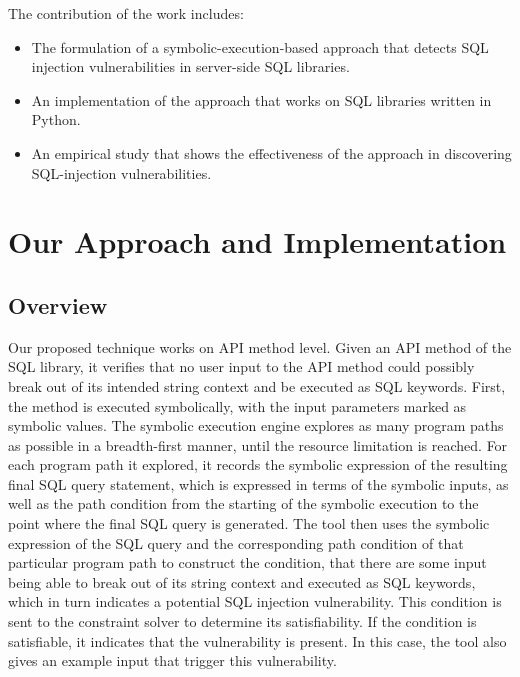 \documentclass[conference]{IEEEtran}
\begin{document}
The contribution of the work includes:

\begin{itemize}

\item The formulation of a symbolic-execution-based approach that detects SQL injection vulnerabilities in server-side SQL libraries.

\item An implementation of the approach that works on SQL libraries written in Python.

\item An empirical study that shows the effectiveness of the approach in discovering SQL-injection vulnerabilities.

\end{itemize}

\section{Our Approach and Implementation}
\label{approach}

\subsection{Overview}

Our proposed technique works on API method level. Given an API method of the SQL library, it verifies that no user input to the API method could possibly break out of its intended string context and be executed as SQL keywords.
First, the method is executed symbolically, with the input parameters marked as symbolic values. The symbolic execution engine explores as many program paths as possible in a breadth-first manner, until the resource limitation is reached. For each program path it explored, it records the symbolic expression of the resulting final SQL query statement, which is expressed in terms of the symbolic inputs, as well as the path condition from the starting of the symbolic execution to the point where the final SQL query is generated. The tool then uses the symbolic expression of the SQL query and the corresponding path condition of that particular program path to construct the condition, that there are some input being able to break out of its string context and executed as SQL keywords, which in turn indicates a potential SQL injection vulnerability. This condition is sent to the constraint solver to determine its satisfiability. If the condition is satisfiable, it indicates that the vulnerability is present. In this case, the tool also gives an example input that trigger this vulnerability.
\end{document}

